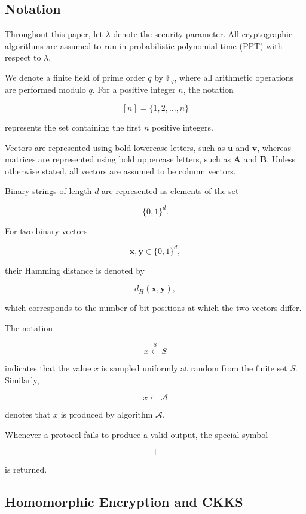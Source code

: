 \documentclass[11pt,a4paper]{article}
\begin{document}
\subsection{Notation}

Throughout this paper, let $\lambda$ denote the security parameter. All cryptographic algorithms are assumed to run in probabilistic polynomial time (PPT) with respect to $\lambda$.

We denote a finite field of prime order $q$ by $\mathbb{F}_{q}$, where all arithmetic operations are performed modulo $q$. For a positive integer $n$, the notation

\[
[n]=\{1,2,\ldots,n\}
\]

represents the set containing the first $n$ positive integers.

Vectors are represented using bold lowercase letters, such as $\mathbf{u}$ and $\mathbf{v}$, whereas matrices are represented using bold uppercase letters, such as $\mathbf{A}$ and $\mathbf{B}$. Unless otherwise stated, all vectors are assumed to be column vectors.

Binary strings of length $d$ are represented as elements of the set

\[
\{0,1\}^{d}.
\]

For two binary vectors

\[
\mathbf{x},\mathbf{y}\in\{0,1\}^{d},
\]

their Hamming distance is denoted by

\[
d_H(\mathbf{x},\mathbf{y}),
\]

which corresponds to the number of bit positions at which the two vectors differ.

The notation

\[
x \xleftarrow{\$} S
\]

indicates that the value $x$ is sampled uniformly at random from the finite set $S$. Similarly,

\[
x\leftarrow\mathcal{A}
\]

denotes that $x$ is produced by algorithm $\mathcal{A}$.

Whenever a protocol fails to produce a valid output, the special symbol

\[
\perp
\]

is returned.

\subsection{Homomorphic Encryption and CKKS}
\end{document}
